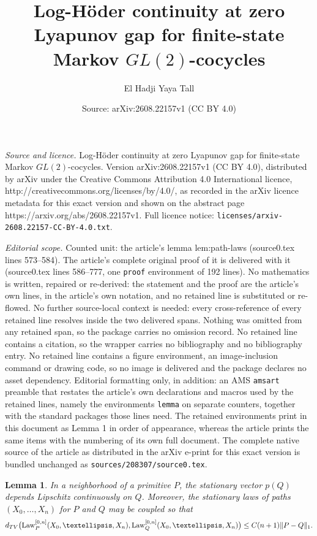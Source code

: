 \documentclass[10pt,a4paper]{amsart}
\title{Log-H\"oder continuity at zero Lyapunov gap for finite-state Markov $GL(2)$-cocycles}
\author{El Hadji Yaya Tall}
\date{Source: arXiv:2608.22157v1 (CC BY 4.0)}
\newtheorem{lemma}{Lemma}
\newcommand{\Law}{\operatorname{Law}}
\begin{document}
\maketitle

\noindent\emph{Source and licence.} Log-H\"oder continuity at zero Lyapunov gap for finite-state Markov $GL(2)$-cocycles. Version arXiv:2608.22157v1 (CC BY 4.0), distributed by arXiv under the Creative Commons Attribution 4.0 International licence, http://creativecommons.org/licenses/by/4.0/, as recorded in the arXiv licence metadata for this exact version and shown on the abstract page https://arxiv.org/abs/2608.22157v1. Full licence notice: \texttt{licenses/arxiv-2608.22157-CC-BY-4.0.txt}.\par\smallskip

\noindent\textit{Editorial scope.} Counted unit: the article's lemma lem:path-laws (source0.tex lines 573--584). The article's complete original proof of it is delivered with it (source0.tex lines 586--777, one \texttt{proof} environment of 192 lines). No mathematics is written, repaired or re-derived: the statement and the proof are the article's own lines, in the article's own notation, and no retained line is substituted or re-flowed.  No further source-local context is needed: every cross-reference of every retained line resolves inside the two delivered spans.  Nothing was omitted from any retained span, so the package carries no omission record.  No retained line contains a citation, so the wrapper carries no bibliography and no bibliography entry.  No retained line contains a figure environment, an image-inclusion command or drawing code, so no image is delivered and the package declares no asset dependency.  Editorial formatting only, in addition: an AMS \texttt{amsart} preamble that restates the article's own declarations and macros used by the retained lines, namely the environments \texttt{lemma} on separate counters, together with the standard packages those lines need.  The retained environments print in this document as Lemma 1 in order of appearance, whereas the article prints the same items with the numbering of its own full document.  The complete native source of the article as distributed in the arXiv e-print for this exact version is bundled unchanged as \texttt{sources/208307/source0.tex}.
\begin{lemma}
\label{lem:path-laws}
In a neighborhood of a primitive $P$, the stationary vector
$p(Q)$ depends Lipschitz continuously on $Q$.  Moreover, the
stationary laws of paths $(X_0,\ldots,X_n)$ for $P$ and $Q$ may
be coupled so that
\begin{equation}\label{eq:path-tv}
 d_{\rm TV}\bigl(\Law_P^{[0,n]}(X_0,\ldots,X_n),
                   \Law_Q^{[0,n]}(X_0,\ldots,X_n)\bigr)
 \le C(n+1)\|P-Q\|_1.
\end{equation}
\end{lemma}
\end{document}
